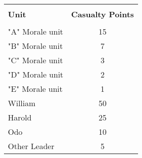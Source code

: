 \begin{center}
  \begin{tabular}{ |lc| }
    \hline &\\[-2.0ex]
    \textbf{Unit} & \textbf{Casualty Points} \\
    \hline &\\[-2.0ex]
    "A" Morale unit & 15 \\
    "B" Morale unit & 7 \\
    "C" Morale unit & 3 \\
    "D" Morale unit & 2 \\
    "E" Morale unit & 1 \\
    William & 50 \\
    Harold & 25 \\
    Odo & 10 \\
    Other Leader & 5 \\
    \hline
  \end{tabular}
\end{center}